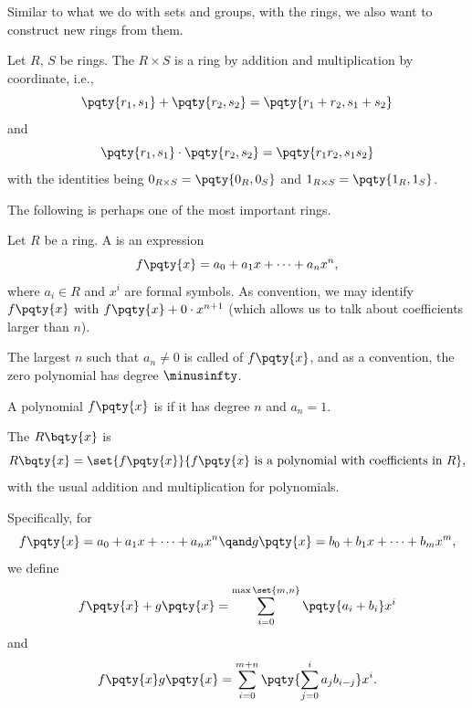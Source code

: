 Similar to what we do with sets and groups, with the rings, we also want to construct new rings from them.

\begin{definition}
    \label{def:direct-product-ring}%
    Let \(R\), \(S\) be rings. The  \(R \times S\) is a ring by addition and multiplication by coordinate, i.e.,
    \[
        \pqty{r_1, s_1} + \pqty{r_2, s_2} = \pqty{r_1 + r_2, s_1 + s_2}
    \]
    and
    \[
        \pqty{r_1, s_1} \cdot \pqty{r_2, s_2} = \pqty{r_1 r_2, s_1 s_2}
    \]
    with the identities being \(0_{R \times S} = \pqty{0_R, 0_S}\) and \(1_{R \times S} = \pqty{1_R, 1_S}\).
\end{definition}

The following is perhaps one of the most important rings.

\begin{definition}[Polynomial]
    \label{def:polynomial}%
    Let \(R\) be a ring. A  is an expression
    \[
    f\pqty{x} = a_0 + a_1 x + \cdots + a_n x^n,
    \]
    where \(a_i \in R\) and \(x^i\) are formal symbols. As convention, we may identify \(f\pqty{x}\) with \(f\pqty{x} + 0 \cdot x^{n + 1}\) (which allows us to talk about coefficients larger than \(n\)).
    
    The largest \(n\) such that \(a_n \neq 0\) is called  of \(f\pqty{x}\), and as a convention, the zero polynomial has degree \(\minusinfty\).

    A polynomial \(f\pqty{x}\) is  if it has degree \(n\) and \(a_n = 1\).
\end{definition}

\begin{definition}
    \label{def:polynomial-ring}%
    The  \(R\bqty{x}\) is
    \[
        R \bqty{x} = \set{f\pqty{x}}{f\pqty{x} \text{ is a polynomial with coefficients in }R},
    \]
    with the usual addition and multiplication for polynomials.
    
    Specifically, for
    \[
        f\pqty{x} = a_0 + a_1 x + \cdots + a_n x^n \qand g\pqty{x} = b_0 + b_1 x + \cdots + b_m x^m,
    \]
    we define
    \[
        f\pqty{x} + g\pqty{x} = \sum_{i = 0}^{\max\set{m, n}} \pqty{a_i + b_i} x^i
    \]
    and
    \[
        f\pqty{x} g\pqty{x} = \sum_{i = 0}^{m + n} \pqty{\sum_{j = 0}^{i} a_j b_{i - j}} x^i.
    \]
\end{definition}

